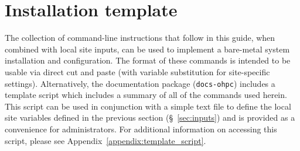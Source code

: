 \section{Installation template}
The collection of command-line instructions that follow in this guide, when
combined with local site inputs, can be used to implement a
bare-metal system installation and configuration. The format of these commands
is intended to be usable via direct cut and paste (with variable substitution
for site-specific settings). Alternatively, the \OHPC{} documentation package
(\texttt{docs-ohpc}) includes a template script which includes a summary of all
of the commands used herein. This script can be used in conjunction with a
simple text file to define the local site variables defined in the previous
section (\S~\ref{sec:inputs}) and is provided as a convenience for
administrators. For additional information on accessing this script, please see
Appendix~\ref{appendix:template_script}.

